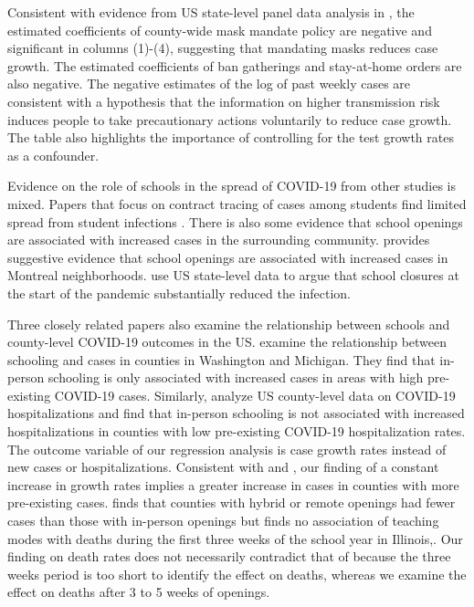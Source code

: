 \documentclass[9pt,twocolumn,twoside,lineno]{pnas-new}
\begin{document}
Consistent with evidence from US state-level panel data analysis in \cite{chernozhukov2021}, the estimated coefficients of county-wide mask mandate policy are negative and significant in columns (1)-(4), suggesting that mandating masks reduces case growth. The estimated coefficients of ban gatherings and stay-at-home orders are also negative. The negative estimates of the log of past weekly cases are consistent with a hypothesis that the information on higher transmission risk induces people to take precautionary actions voluntarily to reduce case growth.  The table also highlights the importance of controlling for the test growth rates as a confounder.

Evidence on the role of schools in the spread of COVID-19 from other studies is mixed. Papers that focus on contract tracing of cases among students find limited spread from student infections \citep{zimmerman2020,brandal2021,ismail2020,gillespie2021,falk2021,willeit2021}.  There is also some evidence that school openings are associated with increased cases in the surrounding community. \cite{bignami2021} provides suggestive evidence that school openings are associated with increased cases in Montreal neighborhoods. \cite{auger2020} use US state-level data to argue that school closures at the start of the pandemic substantially reduced the infection.

Three closely related papers also examine the relationship between schools and county-level COVID-19 outcomes in the US. \cite{goldhaber2021} examine the relationship between schooling and cases in counties in Washington and Michigan. They find that in-person schooling is only associated with increased cases in areas with high pre-existing COVID-19 cases. Similarly, \cite{harris2021} analyze US county-level data on COVID-19 hospitalizations and find that in-person schooling is not associated with increased hospitalizations in counties with low pre-existing COVID-19 hospitalization rates. The outcome variable of our regression analysis is case growth rates instead of new cases or hospitalizations. Consistent with \cite{goldhaber2021} and \cite{harris2021}, our finding of a constant increase in growth rates implies a greater increase in cases in counties with more pre-existing cases. \cite{reinbold2021} finds that counties with hybrid or remote openings had fewer cases than those with in-person openings but finds no association of teaching modes with deaths during the    first three weeks of the school year in Illinois,. Our finding on death rates does not necessarily contradict that of  \cite{reinbold2021} because the three weeks period is too short to identify the effect on deaths, whereas we examine the effect on deaths after 3 to 5 weeks of openings.
\end{document}
